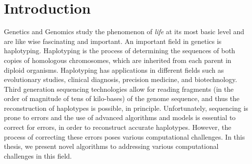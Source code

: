 \chapter{Introduction}\label{ref:chp1}



Genetics and Genomics study the phenomenon of \textit{life} at its most basic level and are like wise fascinating and important.
An important field in genetics is haplotyping.
Haplotyping is the process of determining the sequences of both copies of homologous chromosomes, which are inherited from each parent in diploid organisms.
Haplotyping has applications in different fields such as evolutionary studies, clinical diagnosis, precision medicine, and biotechnology. 
Third generation sequencing technologies allow for reading fragments (in the order of magnitude of tens of kilo-bases) of the genome sequence, and thus the reconstruction of haplotypes is
possible, in principle. Unfortunately, sequencing is prone to errors and the use of advanced algorithms and models is essential to correct for errors, in order to reconstruct accurate haplotypes.
However, the process of correcting these errors poses various computational challenges.
In this thesis, we present novel algorithms to addressing various computational challenges in this field.

